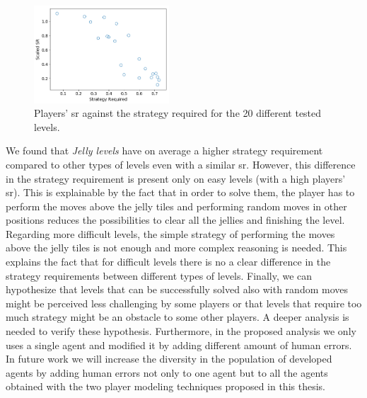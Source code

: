 \begin{figure}[b]
  \centering
    \includegraphics[width=0.45\textwidth]{masters-thesis-master/masters-thesis/contents/05_discussion/strategy_req/sr_strategy.png}
    \caption{Players' \acs{sr} against the strategy required for the 20 different tested levels.}
    \label{fig:sr_strategy}
\end{figure}
We found that \textit{Jelly levels} have on average a higher strategy requirement compared to other types of levels even with a similar \acs{sr}. However, this difference in the strategy requirement is present only on easy levels (with a high players' \acs{sr}). This is explainable by the fact that in order to solve them, the player has to perform the moves above the jelly tiles and performing random moves in other positions reduces the possibilities to clear all the jellies and finishing the level. Regarding more difficult levels, the simple strategy of performing the moves above the jelly tiles is not enough and more complex reasoning is needed. This explains the fact that for difficult levels there is no a clear difference in the strategy requirements between different types of levels. Finally, we can hypothesize that levels that can be successfully solved also with random moves might be perceived less challenging by some players or that levels that require too much strategy might be an obstacle to some other players. A deeper analysis is needed to verify these hypothesis. Furthermore, in the proposed analysis we only uses a single agent and modified it by adding different amount of human errors. In future work we will increase the diversity in the population of developed agents by adding human errors not only to one agent but to all the agents obtained with the two player modeling techniques proposed in this thesis.







